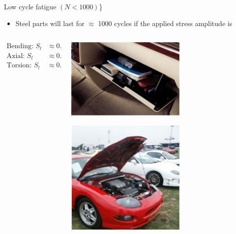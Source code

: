 \documentclass[10pt, svgnames]{beamer}
\begin{document}
\begin{frame}[label={sec:org2e357b1}]{Low cycle fatigue \((N < 1000)\)\}}
\begin{itemize}
\item Steel parts will last for \(\approx\) 1000 cycles if the applied stress amplitude is
\end{itemize}

\begin{columns}
\begin{column}{0.5\columnwidth}
\begin{align*}
  \text{Bending: } S_l &\approx 0.9S_{ut} \\
  \text{Axial: } S_l &\approx 0.75S_{ut} \\
  \text{Torsion: } S_l &\approx 0.72S_{ut}
\end{align*}
\end{column}

\begin{column}{0.5\columnwidth}
\begin{center}
\includegraphics[width=0.6\textwidth]{pictures/glove-comp.pdf}
\end{center}
\begin{center}
\includegraphics[width=0.6\textwidth]{pictures/car-hood.pdf}
\end{center}
\end{column}
\end{columns}
\end{frame}
\end{document}
